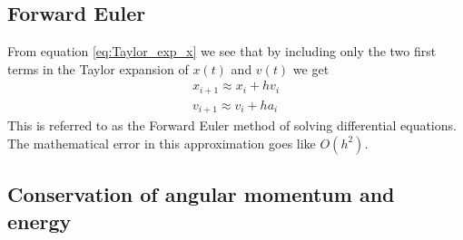 \documentclass[reprint, english,notitlepage,nofootinbib]{revtex4-1}  %
\begin{document}
\subsection{Forward Euler}

From equation \ref{eq:Taylor_exp_x} we see that by including only the two first terms in the Taylor expansion of $x(t)$ and $v(t)$ we get
\begin{align*}
  x_{i+1} \approx x_i + h v_i \\
  v_{i+1} \approx v_i + h a_i
\end{align*}
This is referred to as the Forward Euler method of solving differential equations. The mathematical error in this approximation goes like $O(h^2)$.


\subsection{Conservation of angular momentum and energy}
\end{document}
